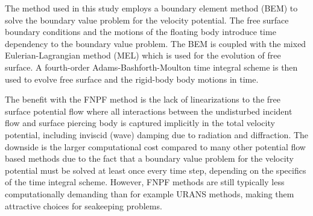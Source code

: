 The method used in this study employs a boundary element method (BEM) \cite{7505983/FD4N3DW2} to solve the boundary value problem for the velocity potential. The free surface boundary conditions and the motions of the floating
body introduce time dependency to the boundary value problem. The BEM is coupled with the mixed Eulerian-Lagrangian method (MEL) \cite{7505983/ZKB494GT} which is used for the evolution of free surface.
A fourth-order Adams-Bashforth-Moulton time integral scheme is then used to evolve free surface and the rigid-body body motions in time.

The benefit with the FNPF method is the lack of linearizations to the free surface potential flow where all interactions between the undisturbed incident flow and surface piercing body is captured implicitly in the total velocity potential, including inviscid (wave) damping due to radiation and diffraction. The downside is the larger
computational cost compared to many other potential flow based methods due to the fact that a boundary value problem for the velocity potential must be solved at least once every time step, depending on the specifics
of the time integral scheme. However, FNPF methods are still typically less computationally demanding than for example URANS methods, making them attractive choices for seakeeping problems.